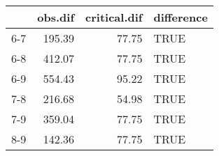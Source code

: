 \begin{table}[ht]
\centering
\begin{tabular}{rrrl}
  \hline
 & obs.dif & critical.dif & difference \\ 
  \hline
6-7 & 195.39 & 77.75 & TRUE \\ 
  6-8 & 412.07 & 77.75 & TRUE \\ 
  6-9 & 554.43 & 95.22 & TRUE \\ 
  7-8 & 216.68 & 54.98 & TRUE \\ 
  7-9 & 359.04 & 77.75 & TRUE \\ 
  8-9 & 142.36 & 77.75 & TRUE \\ 
   \hline
\end{tabular}
\end{table}
